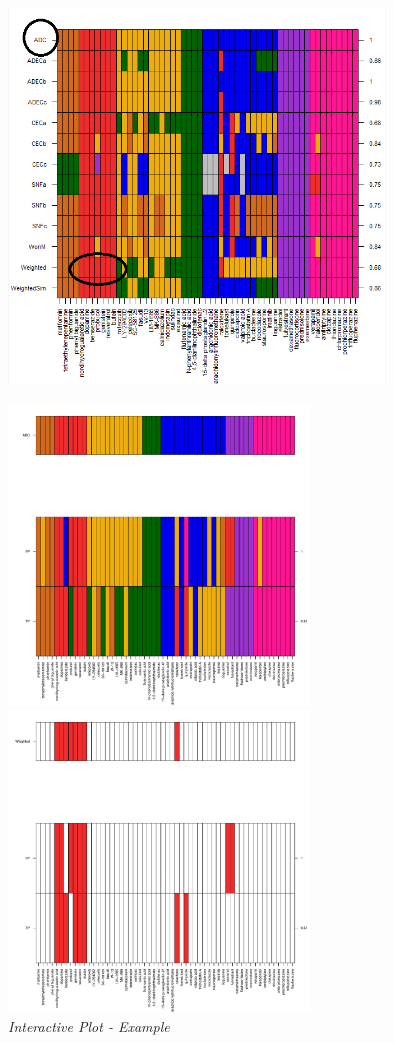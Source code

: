 \documentclass[a4paper]{article}
\begin{document}
\begin{figure}[H]  
\centering
\includegraphics[width=10cm,height=10cm]{Interactive.png}
\end{figure}
\begin{figure}[H]
\begin{minipage}[b]{.5\linewidth}
\centering
\includegraphics[width=8cm,height=8cm]{InteractiveMethod.pdf}
\end{minipage}%
\begin{minipage}[b]{.5\linewidth}
\centering
\includegraphics[width=8cm,height=8cm]{InteractiveCluster.pdf}
\end{minipage}
\caption{{\it Interactive Plot - Example}\label{MCF7_Inter}}
\end{figure}
\end{document}
